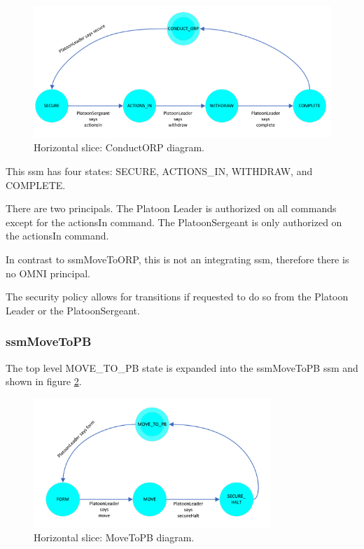 \documentclass[../../main/main.tex]{subfiles}
\begin{document}
\begin{figure}[h!]
\centering
\includegraphics[width=\textwidth]{../figures/ssmConductORPDiagram}
\caption{\label{ssmConductORPDiagram} Horizontal slice: ConductORP diagram.}
\end{figure}


This \gls{ssm} has four states: SECURE, ACTIONS_IN, WITHDRAW, and COMPLETE.  

There are two principals.  The Platoon Leader is authorized on all commands except for the actionsIn command.  The PlatoonSergeant is only authorized on the actionsIn command.

In contrast to ssmMoveToORP, this is not an integrating \gls{ssm}, therefore there is no OMNI principal.  

The security policy allows for transitions if requested to do so from the Platoon Leader or the PlatoonSergeant.  

\clearpage

\subsubsection{ssmMoveToPB}\label{sssec:ssmMoveToPB}
The top level MOVE_TO_PB state is expanded into the ssmMoveToPB \gls{ssm} and shown in figure \ref{ssmMoveToPBDiagram}.

\begin{figure}[h!]
\centering
\includegraphics[width=0.8\textwidth]{../figures/ssmMoveToPBDiagram}
\caption{\label{ssmMoveToPBDiagram} Horizontal slice: MoveToPB diagram.}
\end{figure}
\end{document}
